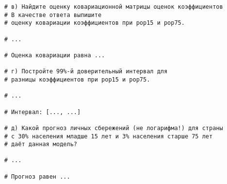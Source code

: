 \documentclass[12pt]{article}
\begin{document}
\begin{enumerate}
\begin{verbatim}
    # в) Найдите оценку ковариационной матрицы оценок коэффициентов
    # В качестве ответа выпишите  
    # оценку ковариации коэффициентов при pop15 и pop75.

    # ... 

    # Оценка ковариации равна ...

    # г) Постройте 99%-й доверительный интервал для 
    # разницы коэффициентов при pop15 и pop75.

    # ...

    # Интервал: [..., ...]

    # д) Какой прогноз личных сбережений (не логарифма!) для страны 
    # с 30% населения младше 15 лет и 3% населения старше 75 лет 
    # даёт данная модель?
    
    # ...

    # Прогноз равен ...
\end{verbatim}



\end{enumerate}
\end{document}
